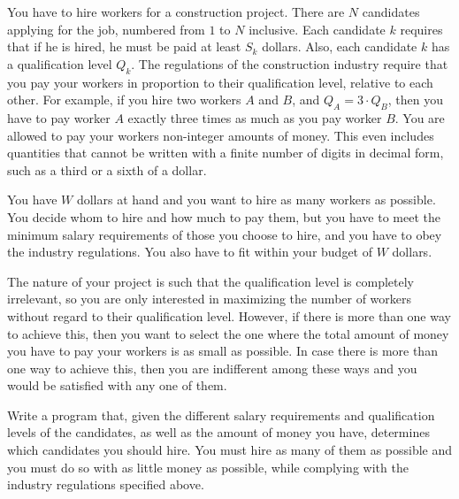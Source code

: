 You have to hire workers for a construction project. There are $N$ candidates applying for the job, numbered from $1$ to $N$ inclusive. Each candidate $k$ requires that if he is hired, he must be paid at least $S_k$ dollars. Also, each candidate $k$ has a qualification level $Q_k$. The regulations of the construction industry require that you pay your workers in proportion to their qualification level, relative to each other. For example, if you hire two workers $A$ and $B$, and $Q_A = 3 \cdot Q_B$, then you
have to pay worker $A$ exactly three times as much as you pay worker $B$. You are allowed to pay your workers non-integer amounts of money. This even includes quantities that cannot be written with a finite number of digits in decimal form, such as a third or a sixth of a dollar.


You have $W$ dollars at hand and you want to hire as many workers as possible. You decide whom to hire and how much to pay them, but you have to meet the minimum salary
requirements of those you choose to hire, and you have to obey the industry regulations. You also have to fit within your budget of $W$ dollars.

The nature of your project is such that the qualification level is completely irrelevant, so you are only interested in maximizing the number of workers without regard to their qualification level. However, if there is more than one way to achieve this, then you want to select the one where the total amount of money you have to pay your workers is as small as possible. In case there is more than one way to achieve this, then you are indifferent among these ways and you would be satisfied with any one of them.

Write a program that, given the different salary requirements and qualification levels of the candidates, as well as the amount of money you have, determines which candidates you should hire. You must hire as many of them as possible and you must do so with as little money as possible, while complying with the industry regulations specified above. 

